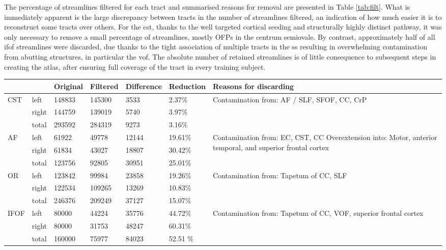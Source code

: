 The percentage of streamlines filtered for each tract and summarised reasons for removal are presented in Table \ref{tab:filt}.
What is immediately apparent is the large discrepancy between tracts in the number of streamlines filtered, an indication of how much easier it is to reconstruct some tracts over others.
For the \gls{cst}, thanks to the well targeted cortical seeding and structurally highly distinct pathway, it was only necessary to remove a small percentage of streamlines, mostly OFPs in the centrum semiovale.
By contrast, approximately half of all \gls{ifof} streamlines were discarded, due thanks to the tight association of multiple tracts in the \gls{ss} resulting in overwhelming contamination from abutting structures, in particular the \gls{vof}.
The absolute number of retained streamlines is of little consequence to subsequent steps in creating the atlas, after ensuring full coverage of the tract in every training subject.

\begin{table*}[t]
  \caption{Streamline filtering statistics. Abbreviations: }
  \label{tab:filt}
  \small
  \begin{tabularx}{\textwidth}{llllll X}\toprule
   &  & Original & Filtered & Difference & Reduction & Reasons for discarding \\
   \midrule
  CST & left & 148833 & 145300 & 3533 & 2.37\% & \multirow{3}{=}{Contamination from: AF / SLF, SFOF, CC, CrP} \\
   & right & 144759 & 139019 & 5740 & 3.97\% &  \\
   & total & 293592 & 284319 & 9273 & 3.16\% &  \\ \addlinespace
  AF & left & 61922 & 49778 & 12144 & 19.61\% & \multirow{3}{=}{Contamination from:  EC, CST, CC Overextension into: Motor, anterior temporal, and superior frontal cortex} \\
   & right & 61834 & 43027 & 18807 & 30.42\% &  \\
   & total & 123756 & 92805 & 30951 & 25.01\% &  \\ \addlinespace
  OR & left & 123842 & 99984 & 23858 & 19.26\% & \multirow{3}{=}{Contamination from: Tapetum of CC, SLF} \\
   & right & 122534 & 109265 & 13269 & 10.83\% &  \\
   & total & 246376 & 209249 & 37127 & 15.07\% & \\ \addlinespace
  IFOF & left & 80000 & 44224 & 35776 & 44.72\% & \multirow{3}{=}{Contamination from: Tapetum of CC, VOF, superior frontal cortex} \\
   & right & 80000 & 31753 & 48247 & 60.31\% &  \\
   & total & 160000 & 75977 & 84023 & 52.51 \% & \\ \toprule
 \end{tabularx}
\end{table*}


